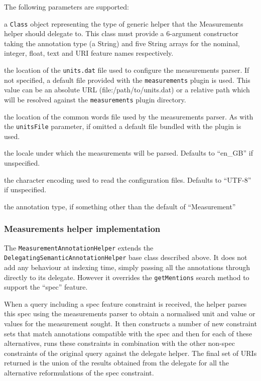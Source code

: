 The following parameters are supported:
\bde
\item[delegateHelperType (required)] a {\tt Class} object representing the type
  of generic helper that the Measurements helper should delegate to.  This
  class must provide a 6-argument constructor taking the annotation type (a
  String) and five String arrays for the nominal, integer, float, text and URI
  feature names respectively.
\item[unitsFile] the location of the {\tt units.dat} file used to configure the
  measurements parser.  If not specified, a default file provided with the
  {\tt measurements} plugin is used.  This value can be an absolute URL
  (file:/path/to/units.dat) or a relative path which will be resolved against
  the {\tt measurements} plugin directory.
\item[commonWords] the location of the common words file used by the
  measurements parser.  As with the {\tt unitsFile} parameter, if omitted a
  default file bundled with the plugin is used.
\item[locale] the locale under which the measurements will be parsed.  Defaults
  to ``en\_GB'' if unspecified.
\item[encoding] the character encoding used to read the configuration files.
  Defaults to ``UTF-8'' if unspecified.
\item[annType] the annotation type, if something other than the default of
  ``Measurement''
\ede

\subsubsection{Measurements helper implementation}

The {\tt MeasurementAnnotationHelper} extends the
{\tt DelegatingSemanticAnnotationHelper} base class described above.  It does
not add any behaviour at indexing time, simply passing all the annotations
through directly to its delegate.  However it overrides the {\tt getMentions}
search method to support the ``spec'' feature.

When a query including a spec feature constraint is received, the helper parses
this spec using the measurements parser to obtain a normalised unit and value
or values for the measurement sought.  It then constructs a number of new
constraint sets that match annotations compatible with the spec and then for
each of these alternatives, runs these constraints in combination with the
other non-spec constraints of the original query against the delegate helper.
The final set of URIs returned is the union of the results obtained from the
delegate for all the alternative reformulations of the spec constraint.

